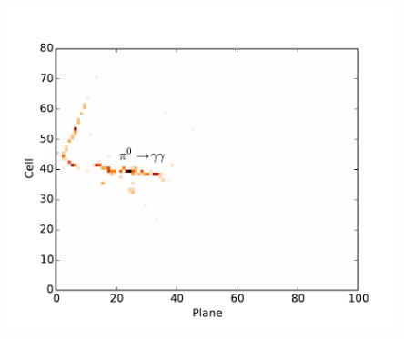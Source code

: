 \documentclass[10pt,professionalfonts,xcolor=table]{beamer}
\begin{document}
\begin{frame}
\begin{columns}[b]
\vspace{-5pt}


\includegraphics[width=0.85\textwidth]{figures/cnn/view_truetype13_caltype6_event144_x.pdf}

\end{columns}
\end{frame}
\end{document}
